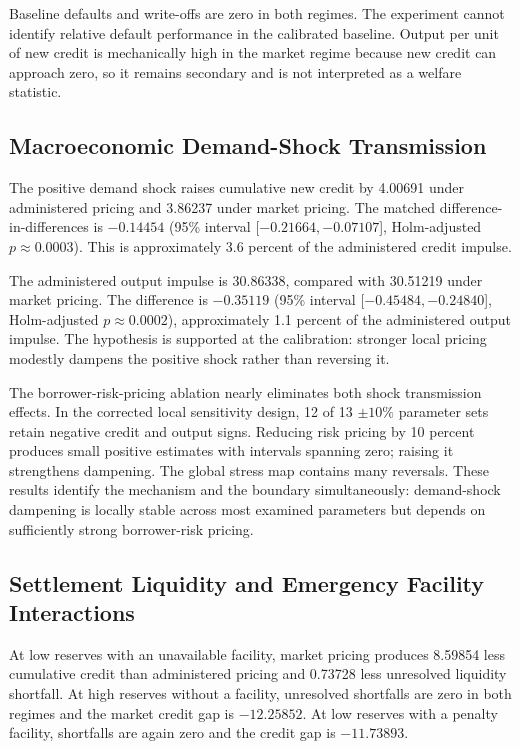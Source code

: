 \documentclass[11pt,a4paper]{article}
\begin{document}
Baseline defaults and write-offs are zero in both regimes. The experiment cannot identify relative default performance in the calibrated baseline. Output per unit of new credit is mechanically high in the market regime because new credit can approach zero, so it remains secondary and is not interpreted as a welfare statistic.

\subsection{Macroeconomic Demand-Shock Transmission}

The positive demand shock raises cumulative new credit by 4.00691 under administered pricing and 3.86237 under market pricing. The matched difference-in-differences is $-0.14454$ (95\% interval [$-0.21664, -0.07107$], Holm-adjusted $p \approx 0.0003$). This is approximately 3.6 percent of the administered credit impulse.

The administered output impulse is 30.86338, compared with 30.51219 under market pricing. The difference is $-0.35119$ (95\% interval [$-0.45484, -0.24840$], Holm-adjusted $p \approx 0.0002$), approximately 1.1 percent of the administered output impulse. The hypothesis is supported at the calibration: stronger local pricing modestly dampens the positive shock rather than reversing it.

The borrower-risk-pricing ablation nearly eliminates both shock transmission effects. In the corrected local sensitivity design, 12 of 13 $\pm 10\%$ parameter sets retain negative credit and output signs. Reducing risk pricing by 10 percent produces small positive estimates with intervals spanning zero; raising it strengthens dampening. The global stress map contains many reversals. These results identify the mechanism and the boundary simultaneously: demand-shock dampening is locally stable across most examined parameters but depends on sufficiently strong borrower-risk pricing.

\subsection{Settlement Liquidity and Emergency Facility Interactions}

At low reserves with an unavailable facility, market pricing produces 8.59854 less cumulative credit than administered pricing and 0.73728 less unresolved liquidity shortfall. At high reserves without a facility, unresolved shortfalls are zero in both regimes and the market credit gap is $-12.25852$. At low reserves with a penalty facility, shortfalls are again zero and the credit gap is $-11.73893$.
\end{document}
